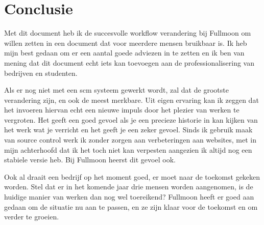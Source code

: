 \chapter{Conclusie}

Met dit document heb ik de succesvolle workflow verandering bij Fullmoon om willen zetten in een document dat voor meerdere mensen bruikbaar is. Ik heb mijn best gedaan om er een aantal goede adviezen in te zetten en ik ben van mening dat dit document echt iets kan toevoegen aan de professionalisering van bedrijven en studenten.

Als er nog niet met een {\sc scm} systeem gewerkt wordt, zal dat de grootste verandering zijn, en ook de meest merkbare. Uit eigen ervaring kan ik zeggen dat het invoeren hiervan echt een nieuwe impuls door het plezier van werken te vergroten. Het geeft een goed gevoel als je een precieze historie in kan kijken van het werk wat je verricht en het geeft je een zeker gevoel. Sinds ik gebruik maak van source control werk ik zonder zorgen aan verbeteringen aan websites, met in mijn achterhoofd dat ik het toch niet kan verpesten aangezien ik altijd nog een stabiele versie heb. Bij Fullmoon heerst dit gevoel ook.

Ook al draait een bedrijf op het moment goed, er moet naar de toekomst gekeken worden. Stel dat er in het komende jaar drie mensen worden aangenomen, is de huidige manier van werken dan nog wel toereikend? Fullmoon heeft er goed aan gedaan om de situatie nu aan te passen, en ze zijn klaar voor de toekomst en om verder te groeien.